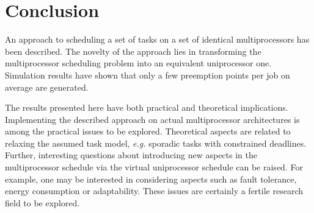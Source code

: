 \documentclass[twocolumn, compsocconf]{IEEEtran}
\newcounter{proc}
\begin{document}
\section{Conclusion}\label{sec:conclusion}

An approach to scheduling a set of tasks on a set of identical multiprocessors
has been described. The novelty of the approach lies in transforming the
multiprocessor scheduling problem into an equivalent uniprocessor
one. Simulation results have shown that only a few preemption points per job on
average are generated.

The results presented here have both practical and theoretical
implications. Implementing the described approach on actual multiprocessor
architectures is among the practical issues to be explored. Theoretical aspects
are related to relaxing the assumed task model, \textit{e.g.} sporadic tasks
with constrained deadlines. Further, interesting questions about introducing new
aspects in the multiprocessor schedule via the virtual uniprocessor schedule can
be raised. For example, one may be interested in considering aspects such as
fault tolerance, energy consumption or adaptability. These issues are certainly
a fertile research field to be explored.




\end{document}
